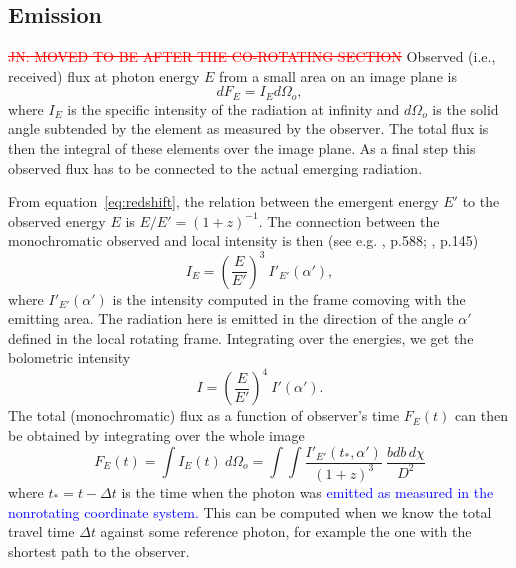 \documentclass{aa}
\newcommand{\be}{\begin{equation}}
\newcommand{\ee}{\end{equation}}
\newcommand{\refe}[1]{\textcolor{blue}{{#1}}}
\newcommand{\refedel}[1]{\textcolor{red}{\sout{#1}}}
\begin{document}
\subsection{Emission}\label{sect:emission}
\refedel{JN: MOVED TO BE AFTER THE CO-ROTATING SECTION}
Observed (i.e., received) flux at photon energy $E$ from a small area on an image plane is
\be
dF_E = I_E d\Omega_o,
\ee
where $I_E$ is the specific intensity of the radiation at infinity and $d\Omega_o$ is the solid angle subtended by the element as measured by the observer. 
The total flux is then the integral of these elements over the image plane.
As a final step this observed flux has to be connected to the actual emerging radiation.

From equation~\eqref{eq:redshift}, the relation between the emergent energy $E'$ to the observed energy $E$ is $E/E' = (1 + z)^{-1}$.
The connection between the monochromatic observed and local intensity is then (see e.g. \citealt{MTW73}, p.588; \citealt{RL79}, p.145)
\be
I_E = \left( \frac{E}{E'} \right)^3 ~I'_{E'}(\alpha'),
\ee
where $I'_{E'}(\alpha')$ is the intensity computed in the frame comoving with the emitting area.
The radiation here is emitted in the direction of the angle $\alpha'$ defined in the local rotating frame.
Integrating over the energies, we get the bolometric intensity
\be
I = \left(\frac{E}{E'} \right)^4 ~I'(\alpha').
\ee
The total (monochromatic) flux as a function of observer's time $F_E(t)$ can then be obtained by integrating over the whole image
\be\label{eq:fluxint}
F_E(t) = \int I_{E}(t) ~d\Omega_o = \int\int \frac{I'_{E'}(t_*, \alpha')}{(1+z)^3}  ~\frac{bdb \, d\chi}{D^2}
\ee
where $t_* = t - \Delta t$ is the time when the photon was \refe{emitted as measured in the nonrotating coordinate system.}
This can be computed when we know the total travel time $\Delta t$ against some reference photon, for example the one with the shortest path to the observer.
\end{document}
